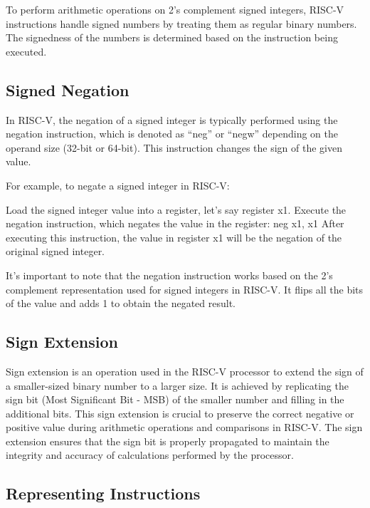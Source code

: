             To perform arithmetic operations on 2's complement signed integers, RISC-V instructions handle signed numbers by treating them as regular binary numbers. The signedness of the numbers is determined based on the instruction being executed.
        
        
        \subsection{Signed Negation}
        
            In RISC-V, the negation of a signed integer is typically performed using the negation instruction, which is denoted as ``neg'' or ``negw'' depending on the operand size (32-bit or 64-bit). This instruction changes the sign of the given value.
            
            For example, to negate a signed integer in RISC-V:
            
            Load the signed integer value into a register, let's say register x1.
            Execute the negation instruction, which negates the value in the register:
            neg x1, x1
            After executing this instruction, the value in register x1 will be the negation of the original signed integer.
            
            It's important to note that the negation instruction works based on the 2's complement representation used for signed integers in RISC-V. It flips all the bits of the value and adds 1 to obtain the negated result.
        
        \subsection{Sign Extension}

            Sign extension is an operation used in the RISC-V processor to extend the sign of a smaller-sized binary number to a larger size. It is achieved by replicating the sign bit (Most Significant Bit - MSB) of the smaller number and filling in the additional bits. This sign extension is crucial to preserve the correct negative or positive value during arithmetic operations and comparisons in RISC-V. The sign extension ensures that the sign bit is properly propagated to maintain the integrity and accuracy of calculations performed by the processor.
        
        \subsection{Representing Instructions}

